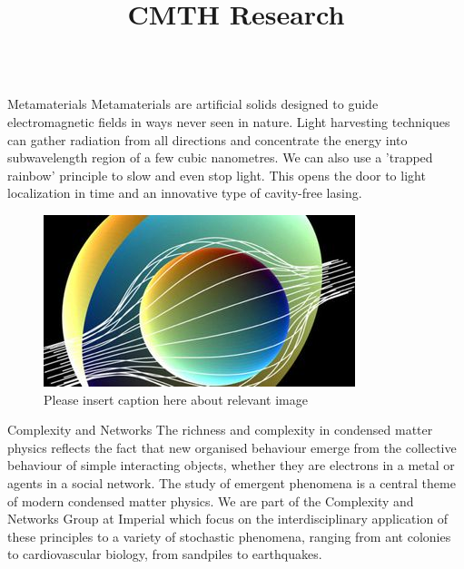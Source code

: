 \documentclass[xcolor={table}]{beamer}
\title{CMTH Research}
\begin{document}
\small
\begin{frame}[fragile=singleslide,t]\centering

\maketitle

\begin{columns}[onlytextwidth,T]

\begin{column}{.47\textwidth}

\begin{block}{Metamaterials}
Metamaterials are artificial solids designed to guide electromagnetic fields in
ways never seen in nature. Light harvesting techniques can gather radiation from
all directions and concentrate the energy into subwavelength region of a few
cubic nanometres. We can also use a 'trapped rainbow' principle to slow and even
stop light. This opens the door to light localization in time and an innovative
type of cavity-free lasing. 
\end{block}

\begin{figure}
    \includegraphics[width=\columnwidth, height=0.15\textheight]{metamaterials.jpg}
    \caption{\footnotesize Please insert caption here about relevant image}
\end{figure}

\begin{block}{Complexity and Networks}
The richness and complexity in condensed matter physics reflects the
fact that new organised behaviour emerge from the collective behaviour of simple
interacting objects, whether they are electrons in a metal or agents in a social
network. The study of emergent phenomena is a central theme of modern condensed
matter physics. We are part of the Complexity and Networks Group at Imperial
which focus on the interdisciplinary application of these principles to a
variety of stochastic phenomena, ranging from ant colonies to cardiovascular
biology, from sandpiles to earthquakes.
\end{block}


\end{column}
\end{columns}
\end{frame}
\end{document}
